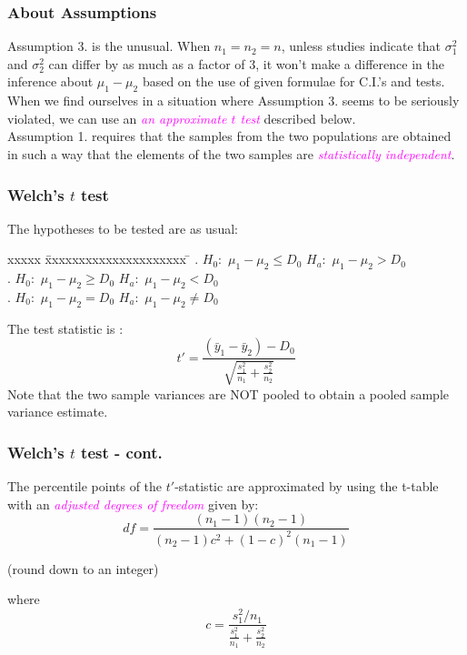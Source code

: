 \documentclass[xcolor=dvipsnames,12pt]{beamer}
\begin{document}
\begin{frame}
\frametitle{About Assumptions}
Assumption 3. is the unusual. When $n_1 = n_2 = n$, unless studies indicate that
$\sigma_1^2$ and $\sigma_2^2$ can differ by as much as a factor
of 3, it won't make a difference in the inference
about $\mu_1 - \mu_2$ based on the use of given formulae
for C.I.'s and tests.\\[.1in] When we find ourselves in a situation where Assumption 3.
seems to be seriously violated, we can use an
\textcolor{magenta}{\textit{an approximate $t$ test}} described below.\\[.1in]
Assumption 1. requires that the samples from the two populations
are obtained in such a way that the elements of the two samples are
\textcolor{magenta}{\textit{statistically independent}}. 
\end{frame}



\begin{frame}
\frametitle{Welch's $t$ test}
The hypotheses to be tested are as usual:
\begin{tabbing}
xxxxx \= xxxxxxxxxxxxxxxxxxxxx \=  \kill
{}. $H_0:$  $\mu_1 - \mu_2 \leq  D_0$ \> $H_a:$  $\mu_1 - \mu_2 > D_0$ \\
. $H_0:$  $\mu_1 - \mu_2 \geq  D_0$ \> $H_a:$  $\mu_1 - \mu_2 < D_0$ \\
. $H_0:$  $\mu_1 - \mu_2 =  D_0$   \> $H_a:$   $\mu_1 - \mu_2 \neq D_0$
\end{tabbing}
 The test statistic is :
$$
  t' = \frac{(\bar{y}_1 - \bar{y}_2) - D_0}
  {\sqrt{\frac{s_1^2}{n_1} + \frac{s_2^2}{n_2}}} 
$$
Note that the two sample variances are NOT pooled to obtain a pooled sample variance estimate.
\end{frame}


\begin{frame}
\frametitle{Welch's $t$ test - cont.}
The percentile points of the $t'$-statistic are approximated by using the t-table with an \textcolor{magenta}{\textit{adjusted degrees of freedom}} given by:
$$
df = \frac{(n_1-1)(n_2-1)}{(n_2-1)c^2 + (1-c)^2(n_1-1)}
$$
\begin{flushright}(round down to an integer)\end{flushright}
 where
$$
  c = \frac{s_1^2/n_1}{\frac{s_1^2}{n_1} + \frac{s_2^2}{n_2}}
$$
\end{frame}
\end{document}
